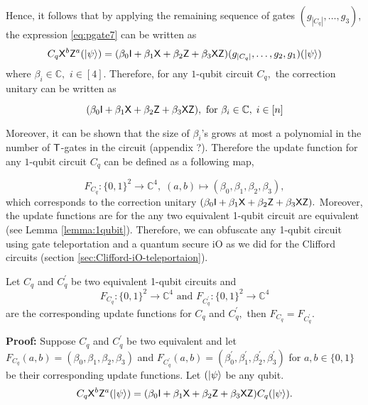 Hence, it follows  that by applying the remaining  sequence of gates $(g_{|C_q|},\ldots,g_3)$, the expression \ref{eq:pgate7} can be written as 
\begin{equation}
\begin{aligned}
\label{eq:pgate8}
C_q {\sf X}^b{\sf Z}^a ({\lvert}\psi\rangle)=(\beta_0 {\sf I} +  \beta_1 {\sf X} + \beta_2 {\sf Z} + \beta_3{\sf X} {\sf Z})(g_{|C_q|},\ldots,g_2,g_1 )({\lvert}\psi\rangle) 
\end{aligned}
\end{equation}
where $\beta_i  \in \mathbb{C},$ $i\in[4].$  Therefore, for any  $1$-qubit circuit $C_q,$ the correction unitary can be written as  

\begin{equation}
\label{eq:pgate9}
 (\beta_0 {\sf I} +   \beta_1 {\sf X} +  \beta_2 {\sf Z} +  \beta_3 {\sf X}{\sf Z}), \mbox{ for }  \beta_i \in \mathbb{C},\; i\in[n]
\end{equation}

Moreover, it can be shown that the size of $\beta_i$'s grows at most a polynomial in the number of ${\sf T}$-gates in the circuit (appendix ?). Therefore the update function for any $1$-qubit circuit $C_q$ can be defined as a following map,

\begin{equation*}
F_{C_q}:\{0,1\}^2\rightarrow \mathbb{C}^4,\; (a,b)\mapsto (\beta_0, \beta_1,\beta_2,\beta_3),
\end{equation*}
which corresponds to the correction unitary $(\beta_0 {\sf I} +  \beta_1 {\sf X} + \beta_2 {\sf Z} + \beta_3{\sf X} {\sf Z}).$
Moreover, the update functions are for the any two equivalent 1-qubit circuit are equivalent (see Lemma \ref{lemma:1qubit}). Therefore, we can obfuscate any 1-qubit circuit using gate teleportation and a quantum secure iO as we did for the Clifford circuits (section \ref{sec:Clifford-iO-teleportaion}).



\begin{lemma}
\label{lemma:1qubit}
Let $C_q$ and $C_q^\prime$ be two equivalent 1-qubit circuits and 
\begin{equation*}
F_{C_q}:\{0,1\}^2\rightarrow \mathbb{C}^4 \mbox{ and } F_{C_q^\prime}:\{0,1\}^2\rightarrow \mathbb{C}^4
\end{equation*}
are the corresponding update functions for $C_q$ and $C_q^\prime,$  then $F_{C_q}=F_{C_q^\prime}.$
\end{lemma}

{\bf Proof:}  Suppose  $C_q$ and $C_q^\prime$ be two equivalent and let  $F_{C_q}(a,b)=(\beta_0, \beta_1, \beta_2, \beta_3)$ and $F_{C_q^\prime}(a,b)=(\beta_0^\prime, \beta_1^\prime, \beta_2^\prime, \beta_3^\prime)$ for $a,b\in\{0,1\}$ be their corresponding update functions. Let $({\lvert}\psi\rangle$ be any  qubit.
\begin{equation}
\label{lemma:1qubit:eq1}
\begin{aligned}
 C_q {\sf X}^b {\sf Z}^a({\lvert}\psi\rangle)=(\beta_0 {\sf I}+\beta_1 {\sf X}+\beta_2 {\sf Z}+\beta_3 {\sf X} {\sf Z})  C_q ({\lvert}\psi\rangle).\\
 \end{aligned}
\end{equation}

